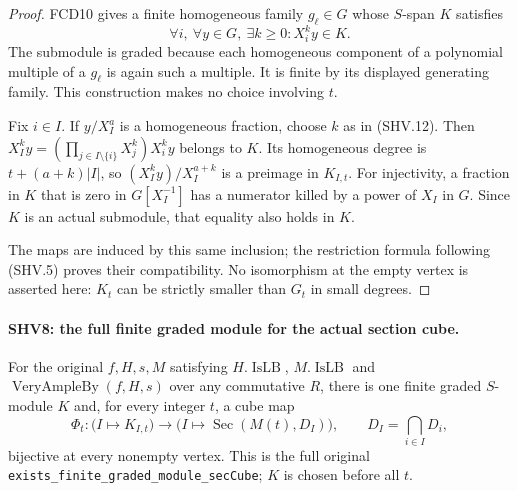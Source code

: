 \begin{proof}
FCD10 gives a finite homogeneous family $g_\ell\in G$ whose
$S$-span $K$ satisfies
\[
       \forall i,\ \forall y\in G,\ \exists k\ge0:
                         X_i^k y\in K.                 \tag{SHV.12}
\]
The submodule is graded because each homogeneous component of a
polynomial multiple of a $g_\ell$ is again such a multiple.
It is finite by its displayed generating family.  This construction
makes no choice involving $t$.

Fix $i\in I$.  If $y/X_I^a$ is a homogeneous fraction, choose
$k$ as in (SHV.12).  Then
$X_I^k y=(\prod_{j\in I\setminus\{i\}}X_j^k)X_i^k y$ belongs
to $K$.  Its homogeneous degree is $t+(a+k)|I|$, so
$(X_I^k y)/X_I^{a+k}$ is a preimage in $K_{I,t}$.
For injectivity, a fraction in $K$ that is zero in $G[X_I^{-1}]$
has a numerator killed by a power of $X_I$ in $G$.  Since $K$
is an actual submodule, that equality also holds in $K$.

The maps are induced by this same inclusion; the restriction
formula following (SHV.5) proves their compatibility.  No
isomorphism at the empty vertex is asserted here: $K_t$ can be
strictly smaller than $G_t$ in small degrees.
\end{proof}

\paragraph{SHV8: the full finite graded module for the actual section cube.}
\label{claim:SHV8}
For the original $f,H,s,M$ satisfying
$H.\operatorname{IsLB}$, $M.\operatorname{IsLB}$ and
$\operatorname{VeryAmpleBy}(f,H,s)$ over any commutative $R$,
there is one finite graded $S$-module $K$ and, for every integer
$t$, a cube map
\[
 \Phi_t:\bigl(I\longmapsto K_{I,t}\bigr)
       \longrightarrow
       \bigl(I\longmapsto\operatorname{Sec}(M(t),D_I)\bigr),
 \qquad D_I=\bigcap_{i\in I}D_i,
                                                        \tag{SHV.13}
\]
bijective at every nonempty vertex.  This is the full original
\texttt{exists\_\allowbreak finite\_\allowbreak graded\_\allowbreak module\_\allowbreak secCube};
$K$ is chosen before all $t$.

